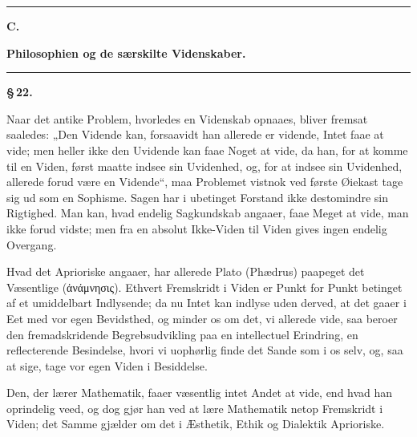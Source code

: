 \documentclass[12pt]{book}
\newcommand{\opage}[1]{\marginnote{\footnotesize\textit{[#1]}}}
\begin{document}
\begin{center}\rule{0.35\linewidth}{0.4pt}\end{center}

\opage{99} \begin{center}
  {\large\bfseries C.}\par\vspace{2pt}
  {\bfseries Philosophien og de særskilte Videnskaber.}\par\vspace{4pt}
  \rule{2cm}{0.4pt}
\end{center}
{}

\begin{center}{\bfseries \S\,22.}\end{center}

Naar det antike Problem, hvorledes en Videnskab opnaaes, bliver fremsat saaledes: „Den
Vidende kan, forsaavidt han allerede er vidende, Intet faae at vide; men heller ikke den
Uvidende kan faae Noget at vide, da han, for at komme til en Viden, først maatte indsee sin
Uvidenhed, og, for at indsee sin Uvidenhed, allerede forud være en Vidende“, maa Problemet
vistnok ved første Øiekast tage sig ud som en Sophisme. Sagen har i ubetinget Forstand ikke
destomindre sin Rigtighed. Man kan, hvad endelig Sagkundskab angaaer, faae Meget at vide,
man ikke forud vidste; men fra en absolut Ikke-Viden til Viden gives ingen endelig
Overgang.

Hvad det Aprioriske angaaer, har allerede Plato (Phædrus) paapeget det Væsentlige
(ἀνάμνησις). Ethvert Fremskridt i Viden er Punkt for Punkt betinget af et umiddelbart
Indlysende; da nu Intet kan indlyse uden derved, at det gaaer i Eet med vor egen
Bevidsthed, og minder os om det, vi allerede vide, saa beroer den fremadskridende
Begrebsudvikling paa en intellectuel Erindring, en reflecterende Besindelse, hvori vi
uophørlig finde det Sande som i os selv, og, saa at sige, tage vor egen Viden i Besiddelse.

Den, der lærer Mathematik, faaer væsentlig intet Andet at vide, end hvad han oprindelig
veed, og dog gjør han ved at lære Mathematik netop Fremskridt i Viden; det Samme gjælder om
det i Æsthetik, Ethik og Dialektik Aprioriske.
\end{document}
